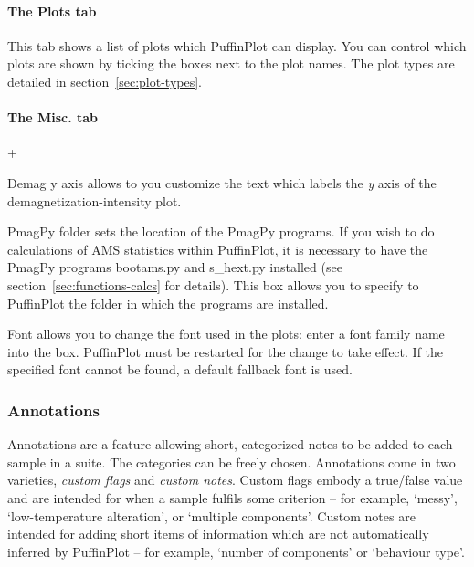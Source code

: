 \documentclass[a4paper,british]{article}
\newcommand{\menuitemlabel}[1]{%
\mbox{\textsf{#1}}\hfil}
\newenvironment{menuitemlist}%
{\begin{list}{}{%
\renewcommand{\makelabel}{\menuitemlabel}%
\setlength{\labelwidth}{35pt}%
\setlength{\leftmargin}%
             {\labelwidth+\labelsep}}}%
{\end{list}}
\newcommand{\ppcmd}[1]{\textsf{#1}} %
\newcommand{\caps}[1]{\MakeTextUppercase{#1}} %
\newcommand{\quot}[1]{`#1'}
\begin{document}
\paragraph{The \ppcmd{Plots} tab}

This tab shows a list of plots which PuffinPlot can display. You can control
which plots are shown by ticking the boxes next to the plot names. The plot
types are detailed in section~\ref{sec:plot-types}.

\paragraph{The \ppcmd{Misc.} tab}

\begin{menuitemlist}

\item[Demag y axis] allows to you customize the text which labels the {\em y}
  axis of the demagnetization-intensity plot.

\item[PmagPy folder] sets the location of the PmagPy programs. If you wish to
  do calculations of \caps{ams} statistics within PuffinPlot, it is necessary
  to have the PmagPy programs \ppcmd{bootams.py} and \ppcmd{s\_hext.py}
  installed (see section~\ref{sec:functions-calcs} for details). This
  box allows you to specify to PuffinPlot the folder in which the programs
  are installed.

\item[Font] allows you to change the font used in the plots: enter a font
  family name into the box. PuffinPlot must be restarted for the change to
  take effect. If the specified font cannot be found, a default fallback font
  is used.

\end{menuitemlist}

\subsubsection{\label{sec:annotations}Annotations}

Annotations are a feature allowing short, categorized notes to be added to
each sample in a suite. The categories can be freely chosen. Annotations come
in two varieties, {\em custom flags} and {\em custom notes}. Custom flags
embody a true/false value and are intended for when a sample fulfils some
criterion -- for example, \quot{messy}, \quot{low-temperature alteration},
or \quot{multiple components}. Custom notes are intended for adding short
items of information which are not automatically inferred by PuffinPlot --
for example, \quot{number of components} or \quot{behaviour type}.
\end{document}

